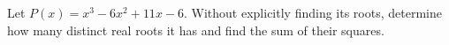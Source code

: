 Let $P(x)=x^3-6x^2+11x-6$. Without explicitly finding its roots, determine how many distinct real roots it has and find the sum of their squares.
